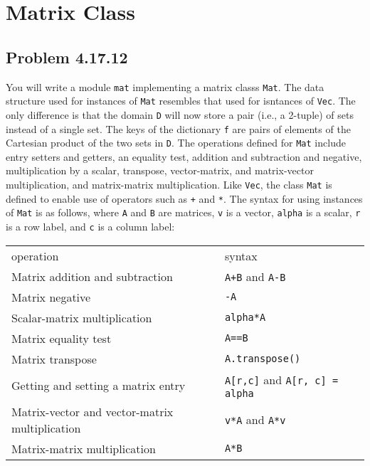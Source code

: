 \documentclass[
  letterpaper,
  DIV=11,
  numbers=noendperiod]{scrartcl}
\begin{document}
\newpage{}

\hypertarget{matrix-class}{%
\section{Matrix Class}\label{matrix-class}}

\hypertarget{problem-4.17.12}{%
\subsection{Problem 4.17.12}\label{problem-4.17.12}}

You will write a module \texttt{mat} implementing a matrix classs
\texttt{Mat}. The data structure used for instances of \texttt{Mat}
resembles that used for isntances of \texttt{Vec}. The only difference
is that the domain \texttt{D} will now store a pair (i.e., a 2-tuple) of
sets instead of a single set. The keys of the dictionary \texttt{f} are
pairs of elements of the Cartesian product of the two sets in
\texttt{D}. The operations defined for \texttt{Mat} include entry
setters and getters, an equality test, addition and subtraction and
negative, multiplication by a scalar, transpose, vector-matrix, and
matrix-vector multiplication, and matrix-matrix multiplication. Like
\texttt{Vec}, the class \texttt{Mat} is defined to enable use of
operators such as \texttt{+} and \texttt{*}. The syntax for using
instances of \texttt{Mat} is as follows, where \texttt{A} and \texttt{B}
are matrices, \texttt{v} is a vector, \texttt{alpha} is a scalar,
\texttt{r} is a row label, and \texttt{c} is a column label:

\begin{table}[hbt!]
\centering
\begin{tabular}{ll}
operation                                      & syntax                               \\
Matrix addition and subtraction                & \verb|A+B| and \verb|A-B|                      \\
Matrix negative                                & \verb|-A|                                 \\
Scalar-matrix multiplication                   & \verb|alpha*A|                            \\
Matrix equality test                           & \verb|A==B|                               \\
Matrix transpose                               & \verb|A.transpose()|                      \\
Getting and setting a matrix entry             & \verb|A[r,c]| and \verb|A[r, c] = alpha| \\
Matrix-vector and vector-matrix multiplication & \verb|v*A| and \verb|A*v|                        \\
Matrix-matrix multiplication                   & \verb|A*B|                               
\end{tabular}
\end{table}
\end{document}
